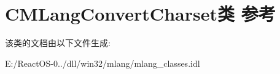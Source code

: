 \hypertarget{class_c_m_lang_convert_charset}{}\section{C\+M\+Lang\+Convert\+Charset类 参考}
\label{class_c_m_lang_convert_charset}


该类的文档由以下文件生成\+:\begin{DoxyCompactItemize}
\item 
E\+:/\+React\+O\+S-\/0../dll/win32/mlang/mlang\+\_\+classes.\+idl\end{DoxyCompactItemize}
